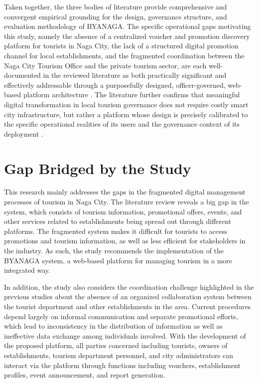 \documentclass{research}
\begin{document}
Taken together, the three bodies of literature provide comprehensive
and convergent empirical grounding for the design, governance structure,
and evaluation methodology of BYANAGA. The specific operational gaps
motivating this study, namely the absence of a centralized voucher and
promotion discovery platform for tourists in Naga City, the lack of a
structured digital promotion channel for local establishments, and the
fragmented coordination between the Naga City Tourism Office and the
private tourism sector, are each well-documented in the reviewed
literature as both practically significant and effectively addressable
through a purposefully designed, officer-governed, web-based platform
architecture \cite{cruz2024, nunez2022, buena2022, carlisle2021,
neda2023}. The literature further confirms that meaningful digital
transformation in local tourism governance does not require costly
smart city infrastructure, but rather a platform whose design is
precisely calibrated to the specific operational realities of its
users and the governance context of its deployment \cite{say2025,
adb2025, ramos2024, wang2024b}.

\section{Gap Bridged by the Study}

This research mainly addresses the gaps in the fragmented digital management
processes of tourism in Naga City. The literature review reveals a big
gap in the system, which consists of tourism information, promotional
offers, events, and other services related to establishments being spread
out through different platforms. The fragmented system makes it difficult
for tourists to access promotions and tourism information, as well as less
efficient for stakeholders in the industry. As such, the study recommends
the implementation of the BYANAGA system, a web-based platform for
managing tourism in a more integrated way.

In addition, the study also considers the coordination challenge
highlighted in the previous studies about the absence of an organized
collaboration system between the tourist department and other
establishments in the area. Current procedures depend largely on
informal communication and separate promotional efforts, which lead to
inconsistency in the distribution of information as well as ineffective
data exchange among individuals involved. With the development of the
proposed platform, all parties concerned including tourists, owners of
establishments, tourism department personnel, and city administrators can
interact via the platform through functions including vouchers,
establishment profiles, event announcement, and report generation.
\end{document}
